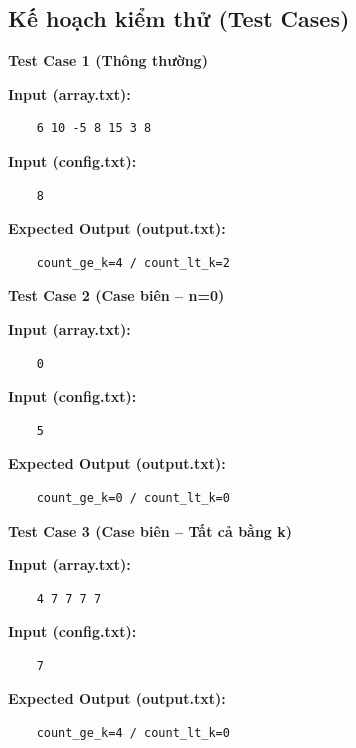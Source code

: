 \subsection{Kế hoạch kiểm thử (Test Cases)}

    \textbf{Test Case 1 (Thông thường)}

    \textbf{Input (array.txt):}
    \begin{lstlisting}
    6 10 -5 8 15 3 8\end{lstlisting}
    \textbf{Input (config.txt):}
    \begin{lstlisting}
    8\end{lstlisting}
    \textbf{Expected Output (output.txt):}
    \begin{lstlisting}
    count_ge_k=4 / count_lt_k=2\end{lstlisting}

    \vspace{0.5cm}

    \textbf{Test Case 2 (Case biên -- n=0)}

    \textbf{Input (array.txt):}
    \begin{lstlisting}
    0\end{lstlisting}
    \textbf{Input (config.txt):}
    \begin{lstlisting}
    5\end{lstlisting}
    \textbf{Expected Output (output.txt):}
    \begin{lstlisting}
    count_ge_k=0 / count_lt_k=0\end{lstlisting}

    \vspace{0.5cm}
    
    \textbf{Test Case 3 (Case biên -- Tất cả bằng k)}

    \textbf{Input (array.txt):}
    \begin{lstlisting}
    4 7 7 7 7\end{lstlisting}
    \textbf{Input (config.txt):}
    \begin{lstlisting}
    7\end{lstlisting}
    \textbf{Expected Output (output.txt):}
    \begin{lstlisting}
    count_ge_k=4 / count_lt_k=0\end{lstlisting}
